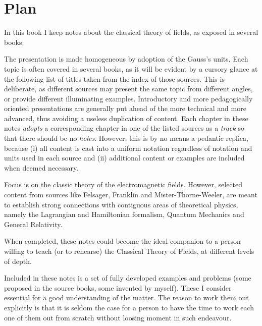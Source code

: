 \chapter*{Plan}
\label{plan} 

In this book I keep notes about the classical theory of fields, as exposed in several books. 

The presentation is made homogeneous by adoption of the Gauss's units. 
Each topic is often covered in several books, as it will be evident by a cursory glance at the following list of titles taken from the index of those sources. This is deliberate, as different sources may present the same topic from different angles, or provide different illuminating examples. Introductory and more pedagogically oriented presentations are generally put ahead of the more technical and more advanced, thus avoiding a useless duplication of content. Each chapter in these notes \textit{adopts} a corresponding chapter in one of the listed sources as a \textit{track} so that there should be no \textit{holes}. However, this is by no means a pedantic replica, because (i) all content is cast into a uniform notation regardless of notation and units used in each source and (ii) additional content or examples are included when deemed necessary. 

Focus is on the classic theory of the electromagnetic fields. However, selected content from sources like Felsager, Franklin and Mister-Thorne-Weeler, are meant to establish strong connections with contiguous areas of theoretical physics, namely the Lagrangian and Hamiltonian formalism, Quantum Mechanics and General Relativity. 

When completed, these notes could become the ideal companion to a person willing to teach (or to rehearse) the Classical Theory of Fields, at different levels of depth. 

Included in these notes is a set of fully developed examples and problems (some proposed in the source books, some invented by myself). These I consider essential for a good understanding of the matter. The reason to work them out explicitly is that it is seldom the case for a person to have the time to work each one of them out from scratch without loosing moment in such endeavour.  \\\\      


